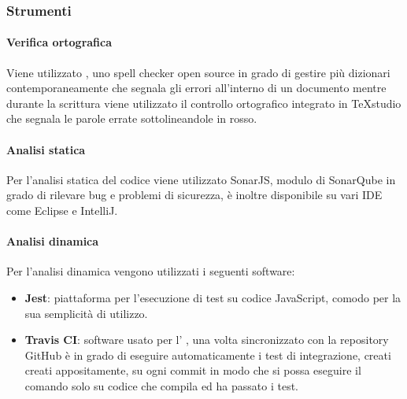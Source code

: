 \subsubsection{Strumenti}
\paragraph{Verifica ortografica} \Spazio
Viene utilizzato , uno spell checker open source in grado di gestire più dizionari contemporaneamente che segnala gli errori all'interno di un documento mentre durante la scrittura viene utilizzato il controllo ortografico integrato in TeXstudio che segnala le parole errate sottolineandole in rosso.
\paragraph{Analisi statica} \Spazio
Per l'analisi statica del codice  viene utilizzato SonarJS, modulo di SonarQube in grado di rilevare bug e problemi di sicurezza, è inoltre disponibile su vari IDE come Eclipse e IntelliJ.
\paragraph{Analisi dinamica} \Spazio
Per l'analisi dinamica vengono utilizzati i seguenti software:
\begin{itemize}
	\item  \textbf{Jest}: piattaforma per l'esecuzione di test su codice JavaScript, comodo per la sua semplicità di utilizzo.
	\item \textbf{Travis CI}: software usato per l' , una volta sincronizzato con la repository GitHub è in grado di eseguire automaticamente i test di integrazione, creati creati appositamente, su ogni commit in modo che si possa eseguire il comando  solo su codice che compila ed ha passato i test.
\end{itemize}
